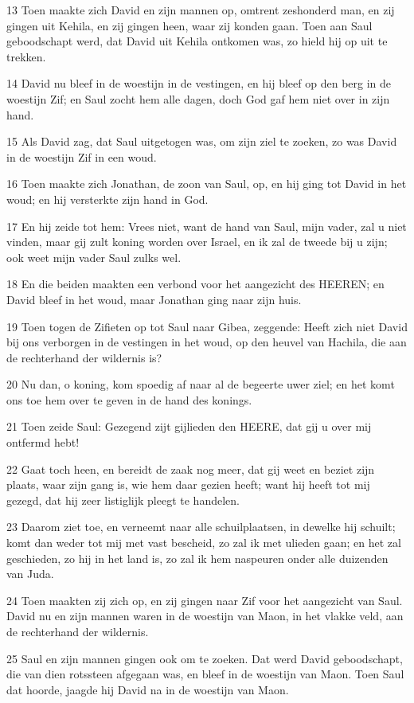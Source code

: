 \par 13 Toen maakte zich David en zijn mannen op, omtrent zeshonderd man, en zij gingen uit Kehila, en zij gingen heen, waar zij konden gaan. Toen aan Saul geboodschapt werd, dat David uit Kehila ontkomen was, zo hield hij op uit te trekken.
\par 14 David nu bleef in de woestijn in de vestingen, en hij bleef op den berg in de woestijn Zif; en Saul zocht hem alle dagen, doch God gaf hem niet over in zijn hand.
\par 15 Als David zag, dat Saul uitgetogen was, om zijn ziel te zoeken, zo was David in de woestijn Zif in een woud.
\par 16 Toen maakte zich Jonathan, de zoon van Saul, op, en hij ging tot David in het woud; en hij versterkte zijn hand in God.
\par 17 En hij zeide tot hem: Vrees niet, want de hand van Saul, mijn vader, zal u niet vinden, maar gij zult koning worden over Israel, en ik zal de tweede bij u zijn; ook weet mijn vader Saul zulks wel.
\par 18 En die beiden maakten een verbond voor het aangezicht des HEEREN; en David bleef in het woud, maar Jonathan ging naar zijn huis.
\par 19 Toen togen de Zifieten op tot Saul naar Gibea, zeggende: Heeft zich niet David bij ons verborgen in de vestingen in het woud, op den heuvel van Hachila, die aan de rechterhand der wildernis is?
\par 20 Nu dan, o koning, kom spoedig af naar al de begeerte uwer ziel; en het komt ons toe hem over te geven in de hand des konings.
\par 21 Toen zeide Saul: Gezegend zijt gijlieden den HEERE, dat gij u over mij ontfermd hebt!
\par 22 Gaat toch heen, en bereidt de zaak nog meer, dat gij weet en beziet zijn plaats, waar zijn gang is, wie hem daar gezien heeft; want hij heeft tot mij gezegd, dat hij zeer listiglijk pleegt te handelen.
\par 23 Daarom ziet toe, en verneemt naar alle schuilplaatsen, in dewelke hij schuilt; komt dan weder tot mij met vast bescheid, zo zal ik met ulieden gaan; en het zal geschieden, zo hij in het land is, zo zal ik hem naspeuren onder alle duizenden van Juda.
\par 24 Toen maakten zij zich op, en zij gingen naar Zif voor het aangezicht van Saul. David nu en zijn mannen waren in de woestijn van Maon, in het vlakke veld, aan de rechterhand der wildernis.
\par 25 Saul en zijn mannen gingen ook om te zoeken. Dat werd David geboodschapt, die van dien rotssteen afgegaan was, en bleef in de woestijn van Maon. Toen Saul dat hoorde, jaagde hij David na in de woestijn van Maon.
